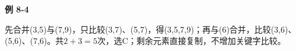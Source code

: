 {\color{ink}\bfseries 例 8-4}\par\vspace{1bp}先合并(3,\allowbreak{}5)与(7,\allowbreak{}9)，只比较(3,\allowbreak{}7)、(5,\allowbreak{}7)，得(3,\allowbreak{}5,\allowbreak{}7,\allowbreak{}9)；再与(6)合并，比较(3,\allowbreak{}6)、(5,\allowbreak{}6)、(7,\allowbreak{}6)。共\(2+\allowbreak{}3=\allowbreak{}5\)次，选C；剩余元素直接复制，不增加关键字比较。
